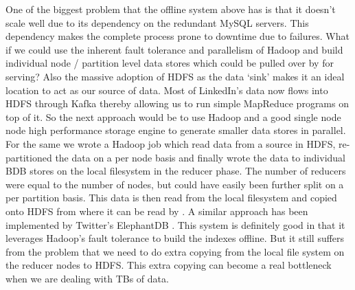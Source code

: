 \documentclass[10pt,twocolumn,preprint,natbib,authoryear]{sigplanconf}
\begin{document}
One of the biggest problem that the offline system above has is that it doesn't scale well due to its dependency on the redundant MySQL servers. This dependency makes the complete process prone to downtime due to failures. What if we could use the inherent fault tolerance and parallelism of Hadoop and build individual node / partition level data stores which could be pulled over by \projectname{} for serving? Also the massive adoption of HDFS as the data `sink' makes it an ideal location to act as our source of data. Most of LinkedIn's data now flows into HDFS through Kafka thereby allowing us to run simple MapReduce programs on top of it. So the next approach would be to use Hadoop and a good single node node high performance storage engine to generate smaller data stores in parallel. For the same we wrote a Hadoop job which read data from a source in HDFS, re-partitioned the data on a per node basis and finally wrote the data to individual BDB stores on the local filesystem in the reducer phase. The number of reducers were equal to the number of nodes, but could have easily been further split on a per partition basis. This data is then read from the local filesystem and copied onto HDFS from where it can be read by \projectname{}. A similar approach has been implemented by Twitter's ElephantDB \cite{elephantdb}. This system is definitely good in that it leverages Hadoop's fault tolerance to build the indexes offline. But it still suffers from the problem that we need to do extra copying from the local file system on the reducer nodes to HDFS. This extra copying can become a real bottleneck when we are dealing with TBs of data. 
\end{document}
